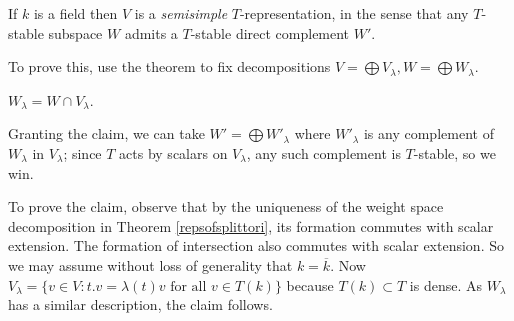 \documentclass[10pt]{article}
\renewcommand{\(}{\left(}
\renewcommand{\)}{\right)}
\renewcommand{\bar}{\overline}
\numberwithin{thm}{subsection}
\begin{document}
\begin{ex}
If $k$ is a field then $V$ is a \textit{semisimple} $T$-representation,
in the sense that any $T$-stable subspace $W$
admits a $T$-stable direct complement $W'$.

To prove this, use the theorem to fix decompositions $V=\bigoplus V_\lambda,
W=\bigoplus W_\lambda$.
\begin{claim}
$W_\lambda=W\cap V_\lambda$.
\end{claim}
Granting the claim, we can take $W'=\bigoplus W'_\lambda$
where $W'_\lambda$ is any complement of $W_\lambda$
in $V_\lambda$;
since $T$ acts by scalars on $V_\lambda$, any such complement is $T$-stable,
so we win.

To prove the claim, observe that by the uniqueness of the weight space decomposition in 
Theorem \ref{repsofsplittori},
its formation commutes with scalar extension.
The formation of intersection also commutes with scalar extension.
So we may assume without loss of generality that $k=\bar k$.
Now $V_\lambda=\{v\in V:t.v=\lambda(t)v \mbox{ for all } v\in T(k)\}$
because $T(k)\subset T$ is dense.
As $W_\lambda$ has a similar description, the claim follows.
\end{ex}
\end{document}
